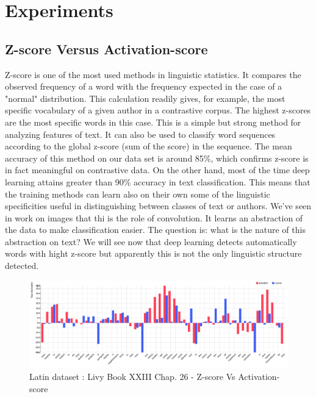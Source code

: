 \section{Experiments}

\subsection{Z-score Versus Activation-score}

Z-score is one of the most used methods in linguistic statistics. It compares the observed frequency of a word with the frequency expected in the case of a "normal" distribution. This calculation readily gives, for example, the most specific vocabulary of a given author in a contrastive corpus. The highest z-scores are the most specific words in this case. This is a simple but strong method for analyzing features of text. It can also be used to classify word sequences according to the global z-score (sum of the score) in the sequence. The mean accuracy of this method on our data set is around 85\%, which confirms z-score is in fact meaningful on contrastive data. On the other hand, most of the time deep learning attains greater than 90\% accuracy in text classification. This means that the training methods can learn also on their own some of the linguistic specificities useful in distinguishing between classes of text or authors. We've seen in work on images that thi is the role of convolution. It learns an abstraction of the data to make classification easier. The question is: what is the nature of this abstraction on text? We will see now that deep learning detects automatically words with hight z-score but apparently this is not the only linguistic structure detected.

\begin{figure}[h]
\begin{center}
\includegraphics[width=16cm]{img/z-score_activations.png}
\caption{Latin dataset : Livy Book XXIII Chap. 26 - Z-score Vs Activation-score}
\label{comparision}
\end{center}
\end{figure}

